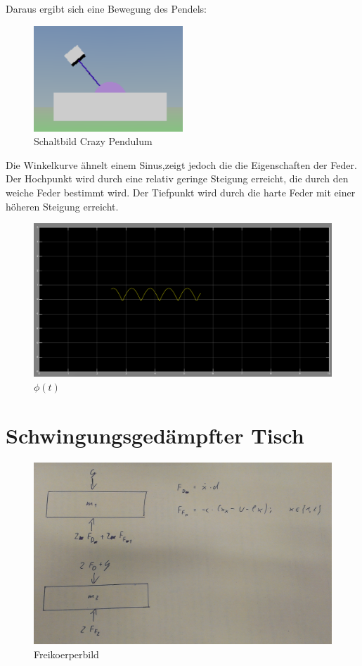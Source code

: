 \documentclass[10pt,a4paper]{article}
\begin{document}
 	Daraus ergibt sich eine Bewegung des Pendels:
 	 	\begin{figure}[H]
 	 		\centering
 	 		\includegraphics[width=0.5\textwidth]{../aufgabe2/pendel.png}
 	 		\caption{Schaltbild Crazy Pendulum}
 	 	\end{figure}
 	Die Winkelkurve ähnelt einem Sinus,zeigt jedoch die die Eigenschaften der Feder. Der Hochpunkt wird durch eine relativ geringe Steigung erreicht, die durch den weiche Feder bestimmt wird. Der Tiefpunkt wird durch die harte Feder mit einer höheren Steigung erreicht. 
 		\begin{figure}[H]
 	 		\centering
 	 		\includegraphics[width=1\textwidth]{../aufgabe2/phit.png}
 	 		\caption{$\phi(t)$}
 	 	\end{figure}

\section{Schwingungsgedämpfter Tisch}
		\begin{figure}[H]
 	 		\centering
 	 		\includegraphics[width=1\textwidth]{../aufgabe3/screens/model.jpg}
 	 		\caption{Freikoerperbild}
 	 	\end{figure}
\end{document}
